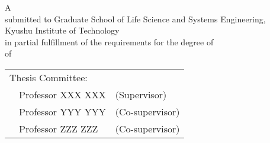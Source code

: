 \renewcommand\thepage{Title2}
\thispagestyle{empty}

\vspace*{8.9truecm}
\begin{center}
 A \edoctitle \\
 submitted to Graduate School of Life Science and Systems Engineering, \\
 Kyushu Institute of Technology \\
 in partial fulfillment of the requirements for the degree of \\
 {\degree} of \major \\
 \bigskip
 
 \eauthor
 
 \vspace*{4.8truemm}
 
 \centering
 \begin{tabular}[t]{p{}ll}
  \multicolumn{2}{l}{Thesis Committee:}  \\
   & Professor XXX XXX & (Supervisor)    \\
   & Professor YYY YYY & (Co-supervisor) \\
   & Professor ZZZ ZZZ & (Co-supervisor) 
 \end{tabular}
\end{center}
